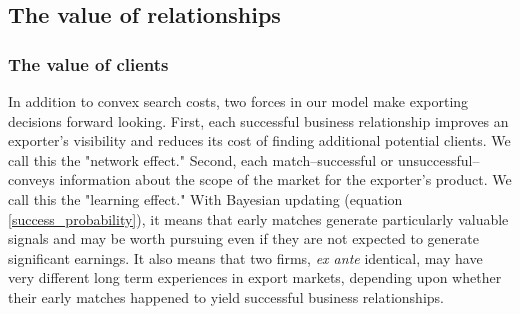 \documentclass[12pt]{article}
\begin{document}
\subsection{The value of relationships}

\subsubsection{The value of clients}

In addition to convex search costs, two forces in our model make exporting
decisions forward looking. First, each successful business relationship
improves an exporter's visibility and reduces its cost of finding additional
potential clients. We call this the "network effect." Second, each
match--successful or unsuccessful--conveys information about the scope of
the market for the exporter's product. We call this the "learning effect."
With Bayesian updating (equation \ref{success_probability}), it means that
early matches generate particularly valuable signals and may be worth
pursuing even if they are not expected to generate significant earnings. It
also means that two firms, \textit{ex ante} identical, may have very
different long term experiences in export markets, depending upon whether
their early matches happened to yield successful business relationships.

\end{document}

